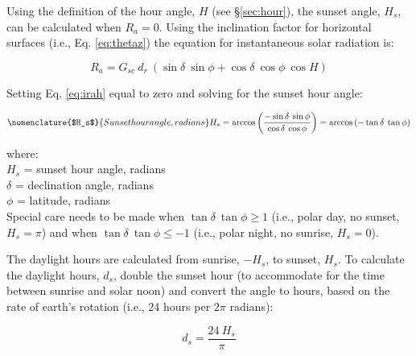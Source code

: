 Using the definition of the hour angle, $H$ (see \S \ref{sec:hour}), the sunset angle, $H_s$, can be calculated when $R_a = 0$. 
Using the inclination factor for horizontal surfaces (i.e., Eq. \ref{eq:thetaz}) the equation for instantaneous solar radiation is:

\begin{equation}
\label{eq:irah}
	R_a = G_{sc}\: d_r\: \left( \sin\delta\: \sin\phi + 
	      \cos\delta\: \cos\phi\: \cos H \right)
\end{equation}

\noindent Setting Eq. \ref{eq:irah} equal to zero and solving for the sunset hour angle:

\begin{equation}
\nomenclature{$H_s$}{Sunset hour angle, radians}
\label{eq:hs}
	H_s  = \arccos\left(\frac{-\sin\delta\: \sin\phi}
		                          {\cos\delta\: \cos\phi}\right)
		 = \arccos\left(-\tan\delta\: \tan\phi\right)
\end{equation}

\noindent where:\\
\indent $H_s$ = sunset hour angle, radians\\
\indent $\delta$ = declination angle, radians\\
\indent $\phi$ = latitude, radians\\

\noindent Special care needs to be made when $\tan\delta\:\tan\phi \geq 1$ (i.e., polar day, no sunset, $H_s = \pi$) and when $\tan\delta\:\tan\phi \leq -1$ (i.e., polar night, no sunrise, $H_s = 0$).

The daylight hours are calculated from sunrise, $-H_s$, to sunset, $H_s$. 
To calculate the daylight hours, $d_s$, double the sunset hour (to accommodate for the time between sunrise and solar noon) and convert the angle to hours, based on the rate of earth's rotation (i.e., 24 hours per $2\pi$ radians):

\begin{equation}
\label{eq:ds}
	d_s  = \frac{24\: H_s}{\pi}
\end{equation}


